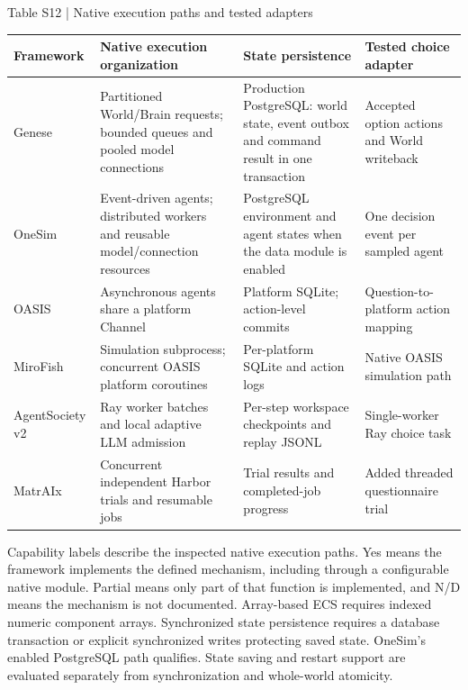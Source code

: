 \documentclass[10pt]{article}
\begin{document}
\begin{center}
\begin{minipage}{\textwidth}
\fontsize{8.5}{10.3}\selectfont
Table S12 | Native execution paths and tested adapters
\par\vspace{4pt}
\begin{tabularx}{\textwidth}{@{}XXXX@{}}
\toprule
Framework & Native execution organization & State persistence & Tested choice adapter \\
\midrule
Genese & Partitioned World/Brain requests; bounded queues and pooled model connections & Production PostgreSQL: world state, event outbox and command result in one transaction & Accepted option actions and World writeback \\
OneSim & Event-driven agents; distributed workers and reusable model/connection resources & PostgreSQL environment and agent states when the data module is enabled & One decision event per sampled agent \\
OASIS & Asynchronous agents share a platform Channel & Platform SQLite; action-level commits & Question-to-platform action mapping \\
MiroFish & Simulation subprocess; concurrent OASIS platform coroutines & Per-platform SQLite and action logs & Native OASIS simulation path \\
AgentSociety v2 & Ray worker batches and local adaptive LLM admission & Per-step workspace checkpoints and replay JSONL & Single-worker Ray choice task \\
MatrAIx & Concurrent independent Harbor trials and resumable jobs & Trial results and completed-job progress & Added threaded questionnaire trial \\
\bottomrule
\end{tabularx}
\par{}
\end{minipage}
\end{center}

Capability labels describe the inspected native execution paths. Yes means the framework implements the defined mechanism, including through a configurable native module. Partial means only part of that function is implemented, and N/D means the mechanism is not documented. Array-based ECS requires indexed numeric component arrays. Synchronized state persistence requires a database transaction or explicit synchronized writes protecting saved state. OneSim's enabled PostgreSQL path qualifies. State saving and restart support are evaluated separately from synchronization and whole-world atomicity.
\end{document}
